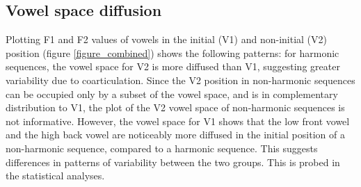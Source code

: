 \documentclass[a4paper,11pt,twocolumn]{article}
\newcommand{\wt}[1]{\textipa{/#1/}} %
\begin{document}
	\subsection{Vowel space diffusion}
	Plotting F1 and F2 values of vowels in the initial (V1) and non-initial (V2) position (figure \ref{figure_combined}) shows the following patterns: for harmonic sequences, the vowel space for V2 is more diffused than V1, suggesting greater variability due to coarticulation. Since the V2 position in non-harmonic sequences can be occupied only by a subset of the vowel space, and is in complementary distribution to V1, the plot of the V2 vowel space of non-harmonic sequences is not informative. However, the vowel space for V1 shows that the low front vowel \wt{a} and the high back vowel \wt{u} are noticeably more diffused in the initial position of a non-harmonic sequence, compared to a harmonic sequence. This suggests differences in patterns of variability between the two groups. This is probed in the statistical analyses. 
	
\end{document}
